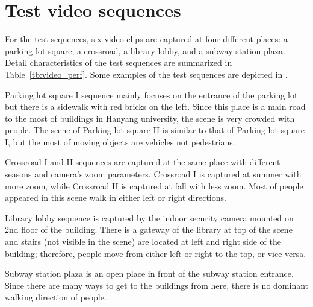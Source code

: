 \documentclass[11pt]{hyu_thesis}
\begin{document}
\section{Test video sequences}
For the test sequences, six video clips are captured at four different places: a parking lot square, a crossroad, a library lobby, and a subway station plaza. Detail characteristics of the test sequences are summarized in Table~\ref{tb:video_perf}. Some examples of the test sequences are depicted in .

Parking lot square I sequence mainly focuses on the entrance of the parking lot but there is a sidewalk with red bricks on the left. Since this place is a main road to the most of buildings in Hanyang university, the scene is very crowded with people. The scene of Parking lot square II is similar to that of Parking lot square I, but the most of moving objects are vehicles not pedestrians.

Crossroad I and II sequences are captured at the same place with different seasons and camera's zoom parameters. Crossroad I is captured at summer with more zoom, while Crossroad II is captured at fall with less zoom. Most of people appeared in this scene walk in either left or right directions.

Library lobby sequence is captured by the indoor security camera mounted on 2nd floor of the building. There is a gateway of the library at top of the scene and stairs (not visible in the scene) are located at left and right side of the building; therefore, people move from either left or right to the top, or vice versa.

Subway station plaza is an open place in front of the subway station entrance. Since there are many ways to get to the buildings from here, there is no dominant walking direction of people.
\end{document}
